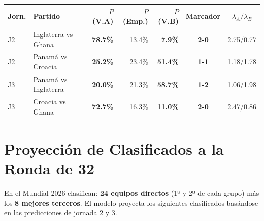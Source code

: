 \documentclass[11pt,a4paper]{article}
\newcommand{\prob}[1]{\textbf{#1\%}}
\begin{document}
\begin{center}
\begin{tabular}{@{}llrrrcc@{}}
\toprule
\textbf{Jorn.} & \textbf{Partido} & \textbf{$P$(V.A)} & \textbf{$P$(Emp.)} & \textbf{$P$(V.B)} & \textbf{Marcador} & \textbf{$\lambda_A/\lambda_B$} \\
\midrule
  J2 & Inglaterra vs Ghana & \cellcolor{green!20}\prob{78.7} & 13.4\% & \cellcolor{red!15}\prob{7.9} & \textbf{2-0} & 2.75/0.77 \\
  J2 & Panamá vs Croacia & \cellcolor{red!15}\prob{25.2} & 23.4\% & \cellcolor{yellow!30}\prob{51.4} & \textbf{1-1} & 1.18/1.78 \\
  J3 & Panamá vs Inglaterra & \cellcolor{red!15}\prob{20.0} & 21.3\% & \cellcolor{yellow!30}\prob{58.7} & \textbf{1-2} & 1.06/1.98 \\
  J3 & Croacia vs Ghana & \cellcolor{green!20}\prob{72.7} & 16.3\% & \cellcolor{red!15}\prob{11.0} & \textbf{2-0} & 2.47/0.86 \\
\bottomrule
\end{tabular}
\end{center}


\newpage


\section{Proyección de Clasificados a la Ronda de 32}

\begin{resaltado}
En el Mundial 2026 clasifican: \textbf{24 equipos directos} (1º y 2º de cada grupo) 
más los \textbf{8 mejores terceros}. El modelo proyecta los siguientes clasificados 
basándose en las predicciones de jornada 2 y 3.
\end{resaltado}

\vspace{0.5cm}
\end{document}
